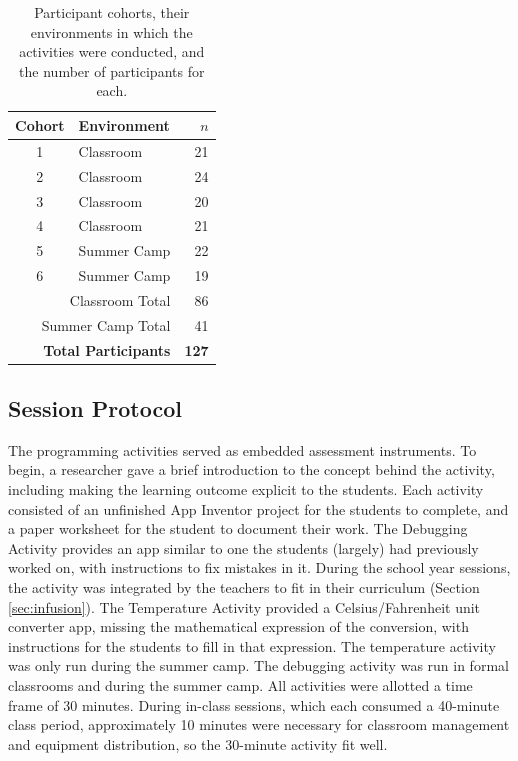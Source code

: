 \begin{table}
\begin{centering}
	\begin{tabular}{clr}
	Cohort & Environment & $n$ \\
	\hline
	1 & Classroom & 21		\\
	2 & Classroom & 24		\\
	3 & Classroom & 20		\\
	4 & Classroom & 21		\\
	5 & Summer Camp & 22	\\
	6 & Summer Camp & 19	\\ \hline
	\multicolumn{2}{r}{Classroom Total} & 86 \\
	\multicolumn{2}{r}{Summer Camp Total} & 41 \\ \hline \hline
	\multicolumn{2}{r}{\textbf{Total Participants}} & \textbf{127} \\ 
	
	\end{tabular}
	\caption[Participant cohorts]{Participant cohorts, their environments in which the activities were conducted, and the number of participants for each.}
	\label{tab:cohorts}
\end{centering}
\end{table}


\subsection{Session Protocol}
The programming activities served as embedded assessment instruments. To begin, a researcher gave a brief introduction to the concept behind the activity, including making the learning outcome explicit to the students. Each activity consisted of an unfinished App Inventor project for the students to complete, and a paper worksheet for the student to document their work. The Debugging Activity provides an app similar to one the students (largely) had previously worked on, with instructions to fix mistakes in it. During the school year sessions, the activity was integrated by the teachers to fit in their curriculum (Section \ref{sec:infusion}). The Temperature Activity provided a Celsius/Fahrenheit unit converter app, missing the mathematical expression of the conversion, with instructions for the students to fill in that expression. The temperature activity was only run during the summer camp. The debugging activity was run in formal classrooms and during the summer camp. All activities were allotted a time frame of 30 minutes. During in-class sessions, which each consumed a 40-minute class period, approximately 10 minutes were necessary for classroom management and equipment distribution, so the 30-minute activity fit well. 

